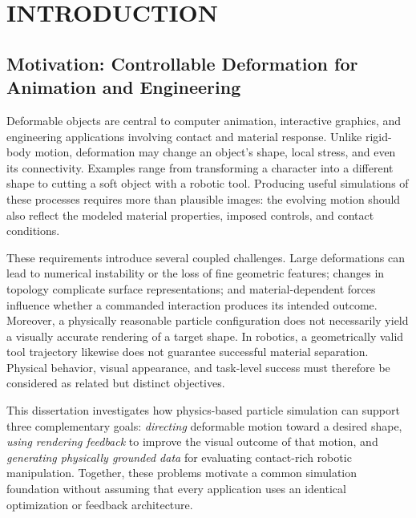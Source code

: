 
\chapter{INTRODUCTION}
\label{CH1_Introduction}

\section{Motivation: Controllable Deformation for Animation and Engineering}
    Deformable objects are central to computer animation, interactive graphics, and engineering applications involving contact and material response. Unlike rigid-body motion, deformation may change an object's shape, local stress, and even its connectivity. Examples range from transforming a character into a different shape to cutting a soft object with a robotic tool. Producing useful simulations of these processes requires more than plausible images: the evolving motion should also reflect the modeled material properties, imposed controls, and contact conditions.
    
    These requirements introduce several coupled challenges. Large deformations can lead to numerical instability or the loss of fine geometric features; changes in topology complicate surface representations; and material-dependent forces influence whether a commanded interaction produces its intended outcome. Moreover, a physically reasonable particle configuration does not necessarily yield a visually accurate rendering of a target shape. In robotics, a geometrically valid tool trajectory likewise does not guarantee successful material separation. Physical behavior, visual appearance, and task-level success must therefore be considered as related but distinct objectives.
    
    This dissertation investigates how physics-based particle simulation can support three complementary goals: \emph{directing} deformable motion toward a desired shape, \emph{using rendering feedback} to improve the visual outcome of that motion, and \emph{generating physically grounded data} for evaluating contact-rich robotic manipulation. Together, these problems motivate a common simulation foundation without assuming that every application uses an identical optimization or feedback architecture.

